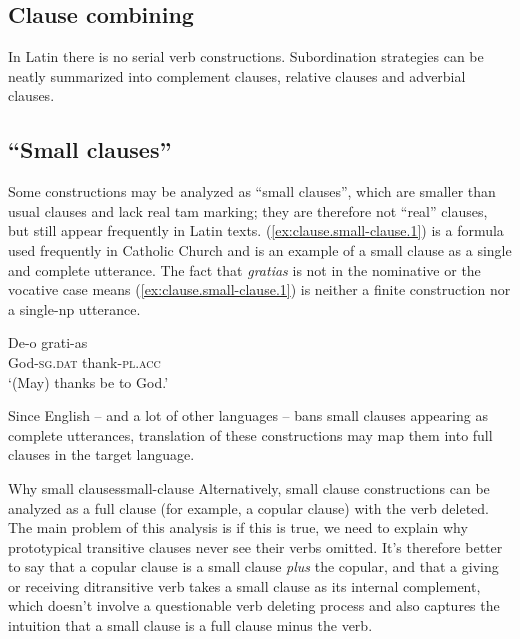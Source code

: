 \documentclass[a4paper, oneside, 12pt]{report}
\newcommand{\form}[1]{\emph{#1}}
\newcommand*{\category}[1]{\textsc{#1}}
\newcommand{\translate}[1]{`#1'}
\begin{document}
\subsection{Clause combining}

In Latin there is no serial verb constructions.
Subordination strategies can be neatly summarized into 
complement clauses, relative clauses and adverbial clauses.

\subsection{``Small clauses''}\label{sec:grammatical.clause.small}

Some constructions may be analyzed as ``small clauses'', 
which are smaller than usual clauses 
and lack real \acs{tam} marking;
they are therefore not ``real'' clauses, 
but still appear frequently in Latin texts.
(\ref{ex:clause.small-clause.1}) is a formula used frequently in Catholic Church 
and is an example of a small clause 
as a single and complete utterance.
The fact that \form{gratias} is not in the nominative or the vocative case 
means (\ref{ex:clause.small-clause.1}) is 
neither a finite construction nor a single-\acs{np} utterance.


\begin{exe}
    \ex \gll De-o grati-as \\
    God-\category{sg}.\category{dat} thank-\category{pl}.\category{acc} \\
    \glt \translate{(May) thanks be to God.}
    \label{ex:clause.small-clause.1}
\end{exe}

Since English -- and a lot of other languages -- 
bans small clauses appearing as complete utterances,
translation of these constructions may map them into full clauses in the target language. 

\begin{infobox}{Why small clauses}{small-clause}
    Alternatively, small clause constructions can be analyzed 
    as a full clause (for example, a copular clause) with the verb deleted.
    The main problem of this analysis is if this is true, 
    we need to explain why prototypical transitive clauses 
    never see their verbs omitted.
    It's therefore better to say 
    that a copular clause is a small clause \emph{plus} the copular,
    and that a giving or receiving ditransitive verb 
    takes a small clause as its internal complement,
    which doesn't involve a questionable verb deleting process
    and also captures the intuition that 
    a small clause is a full clause minus the verb.
\end{infobox}
\end{document}
